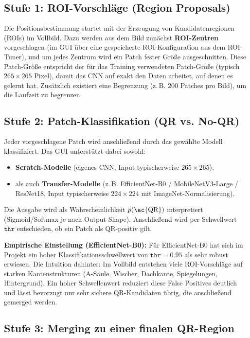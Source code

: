 \subsection{Stufe 1: ROI-Vorschläge (Region Proposals)}
\label{subsec:stage1_rois}

Die Positionsbestimmung startet mit der Erzeugung von Kandidatenregionen (\acp{ROI}) im Vollbild. Dazu werden aus dem Bild zunächst \textbf{\ac{ROI}-Zentren} vorgeschlagen (im \ac{GUI} über eine gespeicherte \ac{ROI}-Konfiguration aus dem \ac{ROI}-Tuner), und um jedes Zentrum wird ein Patch fester Größe ausgeschnitten. Diese Patch-Größe entspricht der für das Training verwendeten Patch-Größe (typisch $265 \times 265$ Pixel), damit das \ac{CNN} auf exakt den Daten arbeitet, auf denen es gelernt hat. Zusätzlich existiert eine Begrenzung (z.\,B. 200 Patches pro Bild), um die Laufzeit zu begrenzen.

\subsection{Stufe 2: Patch-Klassifikation (QR vs. No-QR)}
\label{subsec:stage2_cnn}

Jeder vorgeschlagene Patch wird anschließend durch das gewählte Modell klassifiziert. Das \ac{GUI} unterstützt dabei sowohl:
\begin{itemize}
    \item \textbf{Scratch-Modelle} (eigenes \ac{CNN}, Input typischerweise $265\times265$),
    \item als auch \textbf{Transfer-Modelle} (z.\,B. EfficientNet-B0 / MobileNetV3-Large / ResNet18, Input typischerweise $224\times224$ mit ImageNet-Normalisierung).
\end{itemize}
Die Ausgabe wird als Wahrscheinlichkeit $p(\text{\ac{QR}})$ interpretiert (Sigmoid/Softmax je nach Output-Shape). Anschließend wird per Schwellwert $\texttt{thr}$ entschieden, ob ein Patch als \ac{QR}-positiv gilt.

\textbf{Empirische Einstellung (EfficientNet-B0):} Für EfficientNet-B0 hat sich im Projekt ein hoher Klassifikationsschwellwert von $\texttt{thr}=0.95$ als sehr robust erwiesen. Die Intuition dahinter: Im Vollbild entstehen viele \ac{ROI}-Vorschläge auf starken Kantenstrukturen (A-Säule, Wischer, Dachkante, Spiegelungen, Hintergrund). Ein hoher Schwellenwert reduziert diese False Positives deutlich und lässt bevorzugt nur sehr sichere \ac{QR}-Kandidaten übrig, die anschließend gemerged werden.

\subsection{Stufe 3: Merging zu einer finalen QR-Region}
\label{subsec:stage3_merge}

